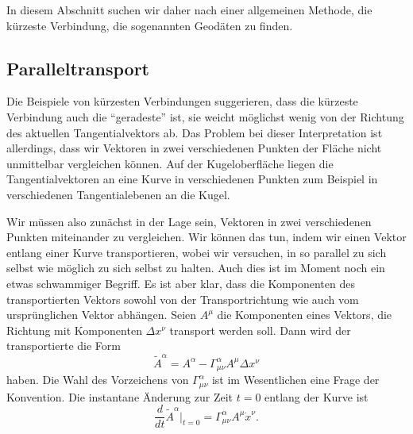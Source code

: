 In diesem Abschnitt suchen wir daher nach einer allgemeinen Methode,
die kürzeste Verbindung, die sogenannten Geodäten zu finden.

\subsection{Paralleltransport}
Die Beispiele von kürzesten Verbindungen suggerieren, dass die kürzeste
Verbindung auch die ``geradeste'' ist, sie weicht möglichst wenig von
der Richtung des aktuellen Tangentialvektors ab.
Das Problem bei dieser Interpretation ist allerdings, dass wir Vektoren
in zwei verschiedenen Punkten der Fläche nicht unmittelbar vergleichen
können.
Auf der Kugeloberfläche liegen die Tangentialvektoren an eine Kurve in
verschiedenen Punkten zum Beispiel in verschiedenen Tangentialebenen
an die Kugel.

Wir müssen also zunächst in der Lage sein, Vektoren in zwei verschiedenen
Punkten miteinander zu vergleichen.
Wir können das tun, indem wir einen Vektor entlang einer Kurve transportieren,
wobei wir versuchen, in so parallel zu sich selbst wie möglich zu sich
selbst zu halten.
Auch dies ist im Moment noch ein etwas schwammiger Begriff. 
Es ist aber klar, dass die Komponenten des transportierten Vektors
sowohl von der Transportrichtung wie auch vom ursprünglichen Vektor
abhängen.
Seien $A^\mu$ die Komponenten eines Vektors, die Richtung mit Komponenten
$\Delta x^\nu$ transport werden soll.
Dann wird der transportierte die Form
\[
\tilde A^\alpha
=
A^\alpha - \Gamma_{\mu\nu}^\alpha A^\mu \Delta x^\nu
\]
haben.
Die Wahl des Vorzeichens von $\Gamma_{\mu\nu}^\alpha$ ist im Wesentlichen
eine Frage der Konvention.
Die instantane Änderung zur Zeit $t=0$ entlang der Kurve ist
\begin{equation}
\frac{d}{dt}\tilde A^\alpha\bigg|_{t=0}
=
\Gamma_{\mu\nu}^\alpha A^\mu \dot x^\nu.
\label{skript:kruemmung:ableitung}
\end{equation}

